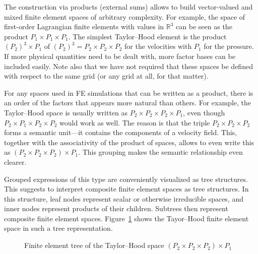 \documentclass[a4paper,10pt,headings=normal,bibliography=totoc]{scrartcl}
\newcommand{\R}{\mathbb{R}}
\begin{document}
The construction via products (external sums) allows to build vector-valued and mixed finite element spaces of arbitrary complexity.
For example, the space of
first-order Lagrangian finite elements with values in $\R^3$ can be seen as the product $P_1 \times P_1 \times P_1$.
The simplest Taylor--Hood element is the product $(P_2)^3 \times P_1$
of $(P_2)^3 = P_2 \times P_2 \times P_2$ for the velocities with $P_1$ for the pressure.
If more physical quantities need to be dealt with, more factor bases can be included easily.  Note also that we have not
required that these spaces be defined with respect to the same grid (or any grid at all, for that matter).

For any spaces used in FE simulations that can be written as a product, there is an order of the factors that appears more natural
than others.  For example, the Taylor--Hood space is usually written as $P_2 \times P_2 \times P_2 \times P_1$,
even though $P_2 \times P_1 \times P_2 \times P_2$ would work as well.  The reason is that the triple
$P_2 \times P_2 \times P_2$ forms a semantic unit---it contains the components of a velocity field.
This, together with the associativity of the product of spaces, allows to even write this
as $(P_2 \times P_2 \times P_2) \times P_1$.  This grouping makes the semantic relationship even clearer.

Grouped expressions of this type are conveniently visualized as tree structures.  This
suggests to interpret composite
finite element spaces as tree structures.  In this structure, leaf nodes represent scalar or otherwise irreducible spaces,
and inner nodes represent products of their children.  Subtrees then represent composite
finite element spaces.  Figure~\ref{fig:dune_functions:taylor_hood_basis_tree} shows the Tayor--Hood finite element
space in such a tree representation.

\begin{figure}
    \begin{center}
    \end{center}
    \caption{Finite element tree of the Taylor--Hood space $(P_2 \times P_2 \times P_2)\times P_1$}
    \label{fig:dune_functions:taylor_hood_basis_tree}
\end{figure}
\end{document}
